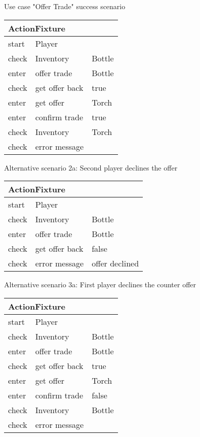 
\noindent Use case "Offer Trade" success scenario

\vspace{0.4cm}
\begin{tabular}{| p{2cm} | p{5.5cm} | p{5.5cm} |} \hline
\multicolumn{3}{|l|}{ActionFixture} \\ \hline
start & Player &  \\ \hline
check & Inventory & Bottle \\ \hline
enter & offer trade & Bottle \\ \hline
check & get offer back & true \\ \hline
enter & get offer & Torch \\ \hline
enter & confirm trade & true \\ \hline
check & Inventory & Torch \\ \hline
check & error message &  \\ \hline
\end{tabular}
\vspace{0.8cm}

\noindent Alternative scenario 2a: Second player declines the offer

\vspace{0.4cm}
\begin{tabular}{| p{2cm} | p{5.5cm} | p{5.5cm} |} \hline
\multicolumn{3}{|l|}{ActionFixture} \\ \hline
start & Player &  \\ \hline
check & Inventory & Bottle \\ \hline
enter & offer trade & Bottle \\ \hline
check & get offer back & false \\ \hline
check & error message & offer declined \\ \hline
\end{tabular}
\vspace{0.8cm}

\noindent Alternative scenario 3a: First player declines the counter offer

\vspace{0.4cm}
\begin{tabular}{| p{2cm} | p{5.5cm} | p{5.5cm} |} \hline
\multicolumn{3}{|l|}{ActionFixture} \\ \hline
start & Player &  \\ \hline
check & Inventory & Bottle \\ \hline
enter & offer trade & Bottle \\ \hline
check & get offer back & true \\ \hline
enter & get offer & Torch \\ \hline
enter & confirm trade & false \\ \hline
check & Inventory & Bottle \\ \hline
check & error message &  \\ \hline
\end{tabular}
\vspace{0.8cm}

